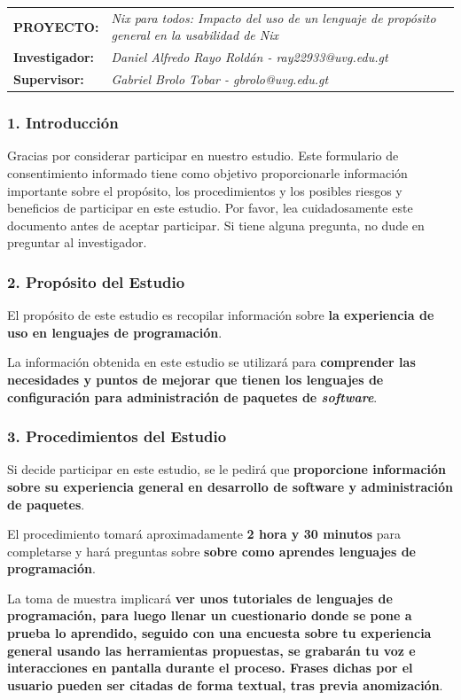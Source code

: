 \noindent
\begin{tabularx}{\linewidth}{@{}lX@{}}
\textbf{PROYECTO:} & \emph{Nix para todos: Impacto del uso de un lenguaje de propósito general en la usabilidad de Nix} \\[0.35em]
\textbf{Investigador:} & \emph{Daniel Alfredo Rayo Roldán - ray22933@uvg.edu.gt} \\[0.35em]
\textbf{Supervisor:} & \emph{Gabriel Brolo Tobar - gbrolo@uvg.edu.gt} \\
\end{tabularx}

\subsubsection{1. Introducción}

Gracias por considerar participar en nuestro estudio. Este formulario de consentimiento
informado tiene como objetivo proporcionarle información importante sobre el propósito, los
procedimientos y los posibles riesgos y beneficios de participar en este estudio. Por favor, lea
cuidadosamente este documento antes de aceptar participar. Si tiene alguna pregunta, no
dude en preguntar al investigador.

\subsubsection{2. Propósito del Estudio}

El propósito de este estudio es recopilar información sobre \textbf{la experiencia de uso en lenguajes de programación}.

La información obtenida en este estudio se utilizará para \textbf{comprender las necesidades y puntos de mejorar que tienen los lenguajes de configuración para administración de paquetes de \emph{software}}.

\subsubsection{3. Procedimientos del Estudio}

Si decide participar en este estudio, se le pedirá que \textbf{proporcione información sobre su experiencia general en desarrollo de software y administración de paquetes}.

El procedimiento tomará aproximadamente \textbf{2 hora y 30 minutos} para completarse y hará preguntas sobre \textbf{sobre como aprendes lenguajes de programación}.

La toma de muestra implicará \textbf{ver unos tutoriales de lenguajes de programación, para luego llenar un cuestionario donde se pone a prueba lo aprendido, seguido con una encuesta sobre tu experiencia general usando las herramientas propuestas, se grabarán tu voz e interacciones en pantalla durante el proceso. Frases dichas por el usuario pueden ser citadas de forma textual, tras previa anomización}.

